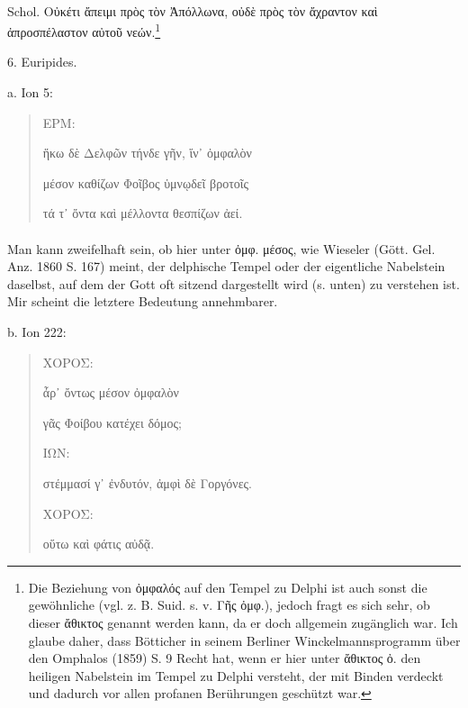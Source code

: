\documentclass[a4paper, 11pt, oneside]{article}
\begin{document}
\paragraph{}
Schol. Οὐκέτι ἄπειμι πρὸς τὸν Ἀπόλλωνα, οὐδὲ πρὸς τὸν ἄχραντον καὶ ἀπροσπέλαστον αὐτοῦ νεών.\footnote{Die Beziehung von ὀμφαλός auf den Tempel zu Delphi ist auch sonst die gewöhnliche (vgl. z. B. Suid. s. v. Γῆς ὀμφ.), jedoch fragt es sich sehr, ob dieser ἄθικτος genannt werden kann, da er doch allgemein zugänglich war. Ich glaube daher, dass Bötticher in seinem Berliner Winckelmannsprogramm über den Omphalos (1859) S. 9 Recht hat, wenn er hier unter ἄθικτος ὀ. den heiligen Nabelstein im Tempel zu Delphi versteht, der mit Binden verdeckt und dadurch vor allen profanen Berührungen geschützt war.}

6. Euripides.

a. Ion 5:
\begin{quotation}
ΕΡΜ:

ἥκω δὲ Δελφῶν τήνδε γῆν, ἵν᾽ ὀμφαλὸν

μέσον καθίζων Φοῖβος ὑμνῳδεῖ βροτοῖς

τά τ᾽ ὄντα καὶ μέλλοντα θεσπίζων ἀεί.
\end{quotation}
\paragraph{}
Man kann zweifelhaft sein, ob hier unter ὀμφ. μέσος, wie Wieseler (Gött. Gel. Anz. 1860 S. 167) meint, der delphische Tempel oder der eigentliche Nabelstein daselbst, auf dem der Gott oft sitzend dargestellt wird (s. unten) zu verstehen ist. Mir scheint die letztere Bedeutung annehmbarer.

b. Ion 222:
\begin{quotation}
ΧΟΡΟΣ:

ἆρ᾽ ὄντως μέσον ὀμφαλὸν

γᾶς Φοίβου κατέχει δόμος;

ΙΩΝ:

στέμμασί γ᾽ ἐνδυτόν, ἀμφὶ δὲ Γοργόνες.

ΧΟΡΟΣ:

οὕτω καὶ φάτις αὐδᾷ.
\end{quotation}
\end{document}
